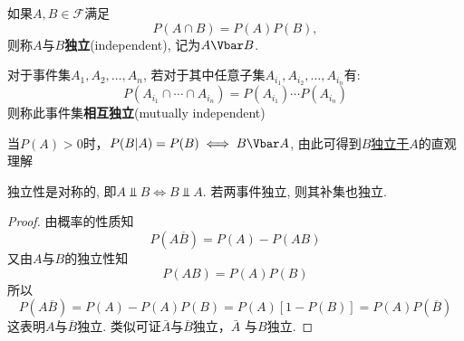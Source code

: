 \begin{definition}[事件的独立性]
    如果$A,B\in\mathscr{F}$满足
    \[ P(A\cap B) = P(A)P(B), \]
    则称$A$与$B$\textbf{独立}(independent), 记为$A \indep B$.

    对于事件集$A_1, A_2, \dotsc, A_n$, 若对于其中任意子集$A_{i_1}, A_{i_2}, \dotsc, A_{i_n}$有:
    \[ P(A_{i_1} \cap \cdots  \cap A_{i_n}) =P(A_{i_1})\cdots P(A_{i_n})  \]
    则称此事件集\textbf{相互独立}(mutually independent)
\end{definition}

\begin{note}
    当$P(A)>0$时，$P(B|A) = P(B) \iff B \indep A$, 由此可得到\underline{$B$独立于$A$}的直观理解
\end{note}

\begin{property}
    独立性是对称的, 即$A \Vbar B \iff B \Vbar A$. 若两事件独立, 则其补集也独立.
    \begin{center}
    \end{center}
\end{property}
\begin{proof}
    由概率的性质知
    \[ P(A \overline{B}) = P(A) - P(AB) \]
    又由$A$与$B$的独立性知
    \[ P(AB) = P(A)P(B) \]
    所以
    \[ P(A \overline{B}) = P(A) - P(A)P(B) = P(A) [1 - P(B)] = P(A)P( \overline{B}) \]
    这表明$A$与$ \overline{B}$独立. 类似可证$\bar A$与$ \overline{B}$独立，$\bar A$ 与$B$独立.
\end{proof}

